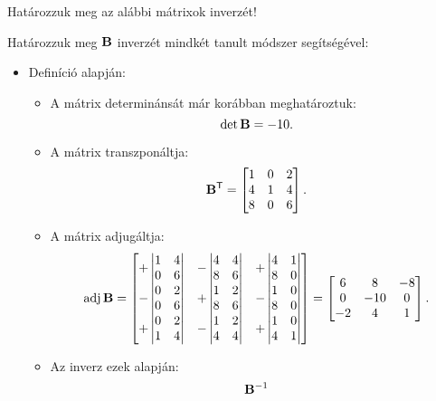 \documentclass[exercise]{math-standalone}
\begin{document}
\begin{exercise}{Határozzuk meg az alábbi mátrixok inverzét!}
{    \tcbline

    Határozzuk meg $\mathbf{B}$ inverzét mindkét tanult módszer segítségével:
    \begin{itemize}
      \item Definíció alapján:
            \begin{itemize}
              \item A mátrix determinánsát már korábban meghatároztuk:
                    \[
                      \det \mathbf{B} = -10
                      \text.
                    \]

              \item A mátrix transzponáltja:
                    \[
                      \mathbf{B}^{\mathsf T} = \begin{bmatrix}
                        1 & 0 & 2 \\
                        4 & 1 & 4 \\
                        8 & 0 & 6
                      \end{bmatrix}
                      \text.
                    \]
              \item A mátrix adjugáltja:
                    \newcommand{\qvmat}[4]{\begin{vmatrix}#1 & #2 \\ #3 & #4\end{vmatrix}}
                    \[
                      \adj \rmat B = \begin{bmatrix}
                        +\qvmat{1}{4}{0}{6} & -\qvmat{4}{4}{8}{6} & +\qvmat{4}{1}{8}{0} \\
                        -\qvmat{0}{2}{0}{6} & +\qvmat{1}{2}{8}{6} & -\qvmat{1}{0}{8}{0} \\
                        +\qvmat{0}{2}{1}{4} & -\qvmat{1}{2}{4}{4} & +\qvmat{1}{0}{4}{1} \\
                      \end{bmatrix} = \begin{bmatrix}
                        6  & 8   & -8 \\
                        0  & -10 & 0  \\
                        -2 & 4   & 1  \\
                      \end{bmatrix}
                      \text.
                    \]
              \item Az inverz ezek alapján:
                    \begin{align*}
                      \rmat B^{-1}

\end{align*}
\end{itemize}
\end{itemize}}
\end{exercise}
\end{document}
